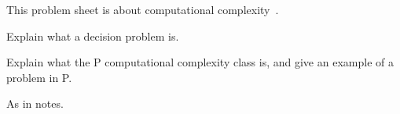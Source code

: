 

\noindent
This problem sheet is about computational complexity~\cite{sipserbook}.

\begin{questions}

\question
Explain what a decision problem is.

\question
Explain what the P computational complexity class is, and give an example of a problem in P.

\begin{solution}
As in notes.
\end{solution}

\end{questions}
